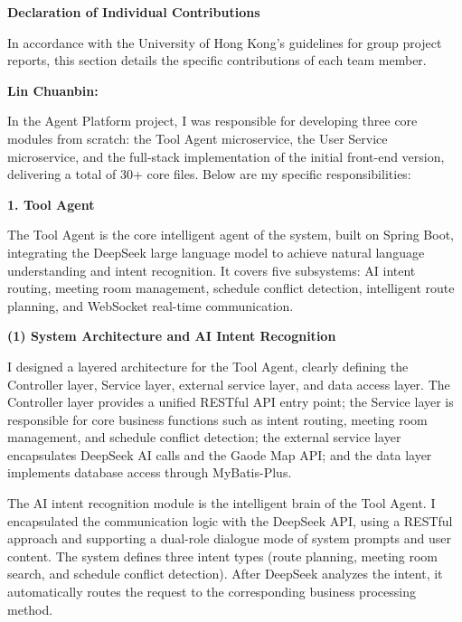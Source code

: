 \newpage
{}
\begin{center}
{\fontsize{16}{19}\selectfont\textbf{Declaration of Individual Contributions}}
\end{center}

\vspace{3mm}

In accordance with the University of Hong Kong's guidelines for group project reports, this section details the specific contributions of each team member.

\vspace{4mm}

\noindent\textbf{Lin Chuanbin:}

\vspace{2mm}

In the Agent Platform project, I was responsible for developing three core modules from scratch: the Tool Agent microservice, the User Service microservice, and the full-stack implementation of the initial front-end version, delivering a total of 30+ core files. Below are my specific responsibilities:

\textbf{1. Tool Agent}

The Tool Agent is the core intelligent agent of the system, built on Spring Boot, integrating the DeepSeek large language model to achieve natural language understanding and intent recognition. It covers five subsystems: AI intent routing, meeting room management, schedule conflict detection, intelligent route planning, and WebSocket real-time communication.

\textbf{(1) System Architecture and AI Intent Recognition}

I designed a layered architecture for the Tool Agent, clearly defining the Controller layer, Service layer, external service layer, and data access layer. The Controller layer provides a unified RESTful API entry point; the Service layer is responsible for core business functions such as intent routing, meeting room management, and schedule conflict detection; the external service layer encapsulates DeepSeek AI calls and the Gaode Map API; and the data layer implements database access through MyBatis-Plus.

The AI intent recognition module is the intelligent brain of the Tool Agent. I encapsulated the communication logic with the DeepSeek API, using a RESTful approach and supporting a dual-role dialogue mode of system prompts and user content. The system defines three intent types (route planning, meeting room search, and schedule conflict detection). After DeepSeek analyzes the intent, it automatically routes the request to the corresponding business processing method.


